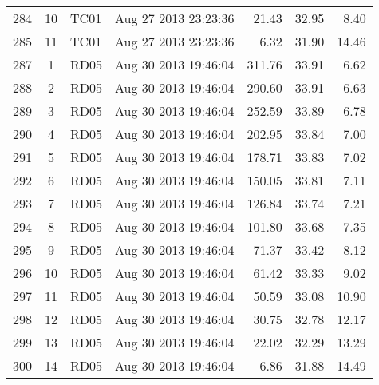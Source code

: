 \documentclass{article}
\begin{document}
\begin{longtable}{ccllrrr}
284&10&TC01&Aug 27 2013 23:23:36&21.43&32.95&8.40\\
285&11&TC01&Aug 27 2013 23:23:36&6.32&31.90&14.46\\
\hline 
287&1&RD05&Aug 30 2013 19:46:04&311.76&33.91&6.62\\
288&2&RD05&Aug 30 2013 19:46:04&290.60&33.91&6.63\\
289&3&RD05&Aug 30 2013 19:46:04&252.59&33.89&6.78\\
290&4&RD05&Aug 30 2013 19:46:04&202.95&33.84&7.00\\
291&5&RD05&Aug 30 2013 19:46:04&178.71&33.83&7.02\\
292&6&RD05&Aug 30 2013 19:46:04&150.05&33.81&7.11\\
293&7&RD05&Aug 30 2013 19:46:04&126.84&33.74&7.21\\
294&8&RD05&Aug 30 2013 19:46:04&101.80&33.68&7.35\\
295&9&RD05&Aug 30 2013 19:46:04&71.37&33.42&8.12\\
296&10&RD05&Aug 30 2013 19:46:04&61.42&33.33&9.02\\
297&11&RD05&Aug 30 2013 19:46:04&50.59&33.08&10.90\\
298&12&RD05&Aug 30 2013 19:46:04&30.75&32.78&12.17\\
299&13&RD05&Aug 30 2013 19:46:04&22.02&32.29&13.29\\
300&14&RD05&Aug 30 2013 19:46:04&6.86&31.88&14.49\\
\hline 

 \end{longtable} 
 
\end{document}
